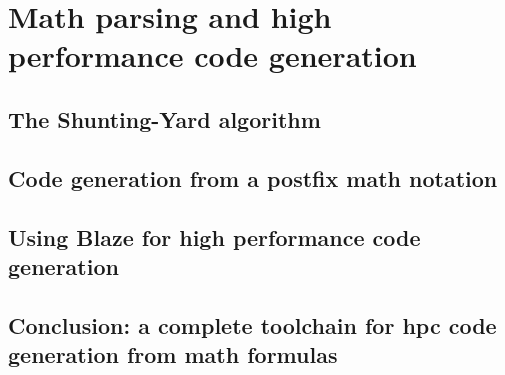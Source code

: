 \documentclass[../main]{subfiles}
\begin{document}
\section{
  Math parsing and high performance code generation
}

\subsection{
  The Shunting-Yard algorithm
}

\subsection{
  Code generation from a postfix math notation
}

\subsection{
  Using Blaze for high performance code generation
}


\subsection{
  Conclusion: a complete toolchain for \acrlong{hpc} code generation from math formulas
}
\end{document}
